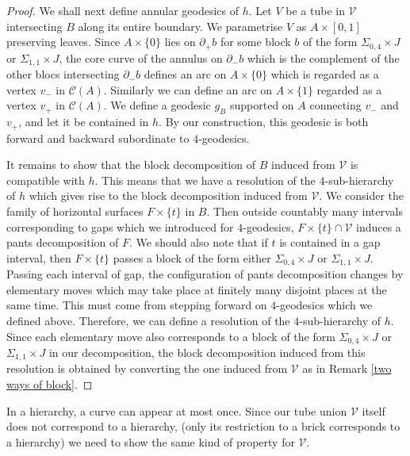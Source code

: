 \documentclass{amsart}
\theoremstyle{definition}
\numberwithin{figure}{section}
\numberwithin{equation}{section}
\newcommand{\blackboard}[1]{\ensuremath{\mathbb{#1}}}
\newcommand{\complexes}{\blackboard{C}}
\def\cc{\complexes}
\def\cc{\mathcal{C}}
\def\cv{\mathcal{V}}
\def\Sg{\Sigma}
\def\Sg{\Sigma}
\begin{document}
\begin{proof}
We shall next define annular geodesics of $h$.
Let $V$ be a tube in $\cv$ intersecting $B$ along its entire boundary.
We parametrise $V$ as $A \times [0,1]$ preserving leaves.
Since $A \times \{0\}$ lies on $\partial_+ b$ for some block $b$ of the form $\Sg_{0,4} \times J$ or $\Sg_{1,1} \times J$, the core curve of the annulus on $\partial_-b$ which is the complement of the other blocs intersecting $\partial_- b$ defines an arc on $A \times \{0\}$ which is regarded as a vertex $v_-$ in $\cc(A)$.
Similarly we can define an arc on $A \times \{1\}$ regarded as a vertex $v_+$ in $\cc(A)$.
We define a geodesic  $g_B$ supported on $A$ connecting $v_-$ and $v_+$, and let it be contained in $h$.
By our construction, this geodesic is both forward and backward subordinate to $4$-geodesics.

It remains to show that the block decomposition of $B$ induced from $\cv$ is compatible with $h$.
This means that we have a resolution of the $4$-sub-hierarchy of $h$ which gives rise to the block decomposition induced from $\cv$.
We consider the family of horizontal surfaces $F \times \{t\}$ in $B$.
Then outside countably many intervals corresponding to gaps which we introduced for $4$-geodesics,  $F \times \{t\} \cap \cv$ induces a pants decomposition of $F$.
We should also note that if $t$ is contained in a gap interval, then $F \times \{t\}$ passes a block of the form either $\Sg_{0,4} \times J$ or $\Sg_{1,1} \times J$.
Passing each interval of gap, the configuration of pants decomposition changes by elementary moves which may take place at finitely many disjoint places at the same time.
This must come from stepping forward on $4$-geodesics which we defined above.
Therefore, we can define a resolution of the $4$-sub-hierarchy of $h$.
Since each elementary move also corresponds to a block of the form $\Sg_{0,4} \times J$ or $\Sg_{1,1} \times J$ in our decomposition, the block decomposition induced from this resolution is obtained by converting the one induced from $\cv$ as in Remark \ref{two ways of block}.
\end{proof}

In a hierarchy, a curve can appear at most once.
Since our tube union $\cv$ itself does not correspond to a hierarchy, (only its restriction to a brick corresponds to a hierarchy) we need to show the same kind of property for $\cv$.
\end{document}
